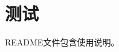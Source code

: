 \documentclass{ctexart}
\begin{document}
\section{测试}

    \par README文件包含使用说明。
    
\begin{figure}[htb]
\end{figure}
    
\end{document}
